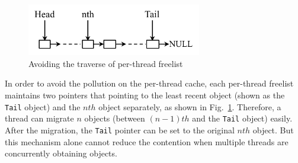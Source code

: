 \begin{figure}
\centering
\includegraphics[width=3in]{figure/perthreadlist}
\vspace{-0.1in}
\caption{Avoiding the traverse of per-thread freelist\label{fig:perthreadlist}}
\vspace{-0.1in}
\end{figure}
In order to avoid the pollution on the per-thread cache, each per-thread freelist maintains two pointers that pointing to the least recent object (shown as the \texttt{Tail} object) and the $nth$ object separately, as shown in Fig.~\ref{fig:perthreadlist}. Therefore, a thread can migrate $n$ objects (between $(n-1)th$ and the \texttt{Tail} object) easily. 
After the migration,  the \texttt{Tail} pointer can be set to the original $nth$ object. But this mechanism alone cannot reduce the contention when multiple threads are concurrently obtaining objects.

